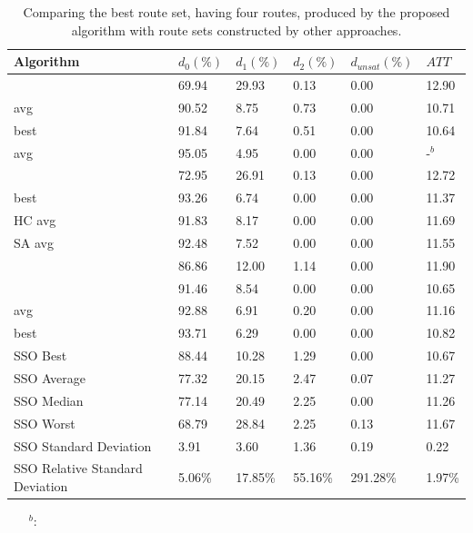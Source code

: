 \begin{table}[H]
	\centering
    \hspace*{-1.0cm}
    \begin{tabular}{|l||l|l|l|l|l|}
 	\hline
 	Algorithm & $d_0(\%)$ & $d_1(\%)$ & $d_2(\%)$ & $d_{unsat}(\%)$ & $ATT$ \\
 	\hline
    \citet{mandl79} & 69.94 & 29.93 & 0.13 & 0.00 & 12.90 \\
    \citet{kechagiopoulos14} avg & 90.52 & 8.75 & 0.73 & 0.00 & 10.71 \\
    \citet{kechagiopoulos14} best & 91.84 & 7.64 & 0.51 & 0.00 & 10.64 \\
    \citet{nikolic14} avg & 95.05 & 4.95 & 0.00 & 0.00 & -$^b$ \\
    \citet{kidwai98} & 72.95 & 26.91 & 0.13 & 0.00 & 12.72 \\
    \citet{fan10} best & 93.26 & 6.74 & 0.00 & 0.00 & 11.37 \\
    \citet{fan10} HC avg & 91.83 & 8.17 & 0.00 & 0.00 & 11.69 \\
    \citet{fan10} SA avg & 92.48 & 7.52 & 0.00 & 0.00 & 11.55 \\
    \citet{chakroborty02} & 86.86 & 12.00 & 1.14 & 0.00 & 11.90 \\
    \citet{zhang10} & 91.46 & 8.54 & 0.00 & 0.00 & 10.65 \\
    \citet{chew12} avg & 92.88 & 6.91 & 0.20 & 0.00 & 11.16 \\
    \citet{chew12} best & 93.71 & 6.29 & 0.00 & 0.00 & 10.82 \\
	\hline
    \hline
    SSO Best & 88.44 & 10.28 & 1.29 & 0.00 & 10.67 \\
    SSO Average & 77.32 & 20.15 & 2.47 & 0.07 & 11.27 \\
    SSO Median & 77.14 & 20.49& 2.25 & 0.00 & 11.26 \\
    SSO Worst & 68.79 & 28.84 & 2.25 & 0.13 & 11.67 \\
    SSO Standard Deviation & 3.91& 3.60 & 1.36 & 0.19 & 0.22 \\
    SSO Relative Standard Deviation & 5.06\% & 17.85\% & 55.16\% & 291.28\% & 1.97\% \\
    \hline
    \end{tabular}
    \caption {Comparing the best route set, having four routes, produced by the proposed algorithm with route sets constructed by other approaches.}
    \begin{itemize}[noitemsep]
    \item[$^b$:] 
    \end{itemize}
    \label{table:performanceComparison_4}
\end{table}

